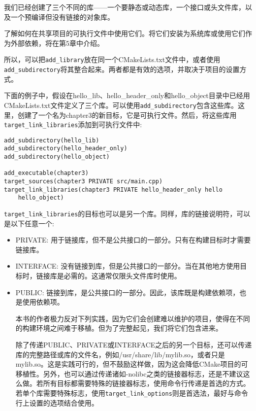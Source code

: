 我们已经创建了三个不同的库——一个要静态或动态库，一个接口或头文件库，以及一个预编译但没有链接的对象库。

了解如何在共享项目的可执行文件中使用它们。将它们安装为系统库或使用它们作为外部依赖，将在第5章中介绍。

所以，可以把\texttt{add\_library}放在同一个CMakeLists.txt文件中，或者使用\texttt{add\_subdirectory}将其整合起来。两者都是有效的选项，并取决于项目的设置方式。

下面的例子中，假设在hello\_lib、hello\_header\_only和hello\_object目录中已经用CMakeLists.txt文件定义了三个库。可以使用\texttt{add\_subdirectory}包含这些库。这里，创建了一个名为chapter3的新目标，它是可执行文件。然后，将这些库用\texttt{target\_link\_libraries}添加到可执行文件中:

\begin{lstlisting}[style=styleCMake]
add_subdirectory(hello_lib)
add_subdirectory(hello_header_only)
add_subdirectory(hello_object)

add_executable(chapter3)
target_sources(chapter3 PRIVATE src/main.cpp)
target_link_libraries(chapter3 PRIVATE hello_header_only hello
	hello_object)
\end{lstlisting}

\texttt{target\_link\_libraries}的目标也可以是另一个库。同样，库的链接说明符，可以是以下任意一个:

\begin{itemize}
\item 
PRIVATE: 用于链接库，但不是公共接口的一部分。只有在构建目标时才需要链接库。

\item 
INTERFACE: 没有链接到库，但是公共接口的一部分。当在其他地方使用目标时，链接库是必需的。这通常仅限头文件库时使用。

\item 
PUBLIC: 链接到库，是公共接口的一部分。因此，该库既是构建依赖项，也是使用依赖项。

\begin{tcolorbox}[colback=red!5!white,colframe=red!75!black,title=不推荐的做法]
本书的作者极力反对下列实践，因为它们会创建难以维护的项目，使得在不同的构建环境之间难于移植。但为了完整起见，我们将它们包含进来。

除了传递PUBLIC、PRIVATE或INTERFACE之后的另一个目标，还可以传递库的完整路径或库的文件名，例如/usr/share/lib/mylib.so，或者只是mylib.so。这是实践可行的，但不鼓励这样做，因为这会降低CMake项目的可移植性。另外，也可以通过传递诸如-nolibc之类的链接器标志，还是不建议这么做。若所有目标都需要特殊的链接器标志，使用命令行传递是首选的方式。若单个库需要特殊标志，使用\texttt{target\_link\_options}则是首选法，最好与命令行上设置的选项结合使用。
\end{tcolorbox}
\end{itemize}

